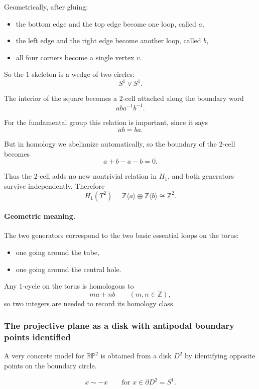 \documentclass[12pt,a4paper]{article}
\theoremstyle{notespace}
\begin{document}
Geometrically, after gluing:

\begin{itemize}
	\item the bottom edge and the top edge become one loop, called \(a\),
	\item the left edge and the right edge become another loop, called \(b\),
	\item all four corners become a single vertex \(v\).
\end{itemize}

So the \(1\)-skeleton is a wedge of two circles:
\[
S^1 \vee S^1.
\]

The interior of the square becomes a \(2\)-cell attached along the boundary word
\[
aba^{-1}b^{-1}.
\]

For the fundamental group this relation is important, since it says
\[
ab = ba.
\]

But in homology we abelianize automatically, so the boundary of the \(2\)-cell becomes
\[
a+b-a-b=0.
\]

Thus the \(2\)-cell adds no new nontrivial relation in \(H_1\), and both generators survive independently. Therefore
\[
H_1(T^2)=\mathbb Z\langle a\rangle \oplus \mathbb Z\langle b\rangle \cong \mathbb Z^2.
\]

\paragraph{Geometric meaning.}
The two generators correspond to the two basic essential loops on the torus:

\begin{itemize}
	\item one going around the tube,
	\item one going around the central hole.
\end{itemize}

Any \(1\)-cycle on the torus is homologous to
\[
ma+nb
\qquad (m,n\in\mathbb Z),
\]
so two integers are needed to record its homology class.

\subsubsection{The projective plane as a disk with antipodal boundary points identified}

A very concrete model for \(\mathbb{RP}^2\) is obtained from a disk \(D^2\) by identifying opposite points on the boundary circle.

\[
x \sim -x \qquad \text{for } x\in \partial D^2=S^1.
\]
\end{document}
